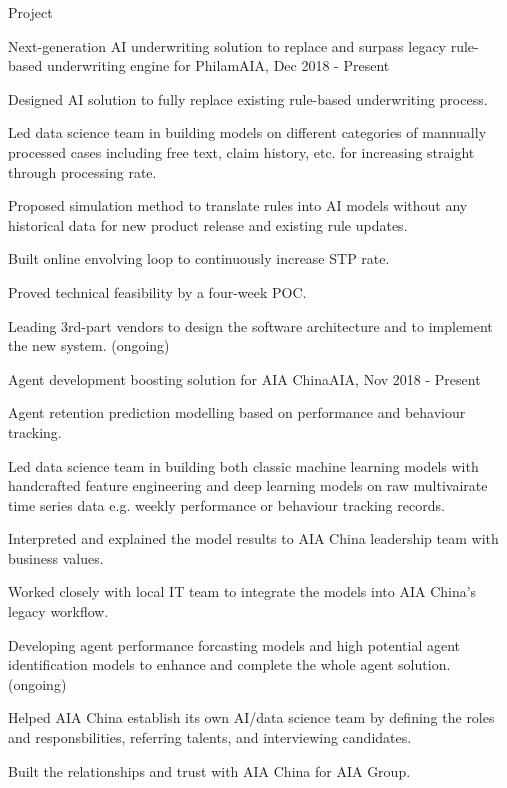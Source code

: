 \documentclass{resume} %
\begin{document}
\begin{rSection}{Project}

\begin{rSubsection}{Next-generation AI underwriting solution to replace and surpass legacy rule-based underwriting engine for Philam}{}{AIA, Dec 2018 - Present}{}
\item Designed AI solution to fully replace existing rule-based underwriting process.
\item Led data science team in building models on different categories of mannually processed cases including free text, claim history, etc. for increasing straight through processing rate.
\item Proposed simulation method to translate rules into AI models without any historical data for new product release and existing rule updates.
\item Built online envolving loop to continuously increase STP rate.
\item Proved technical feasibility by a four-week POC.
\item Leading 3rd-part vendors to design the software architecture and to implement the new system. (ongoing)
\end{rSubsection}


\begin{rSubsection}{Agent development boosting solution for AIA China}{}{AIA, Nov 2018 - Present}{}
\item Agent retention prediction modelling based on performance and behaviour tracking.
\item Led data science team in building both classic machine learning models with handcrafted feature engineering and deep learning models on raw multivairate time series data e.g. weekly performance or behaviour tracking records.
\item Interpreted and explained the model results to AIA China leadership team with business values.
\item Worked closely with local IT team to integrate the models into AIA China's legacy workflow.
\item Developing agent performance forcasting models and high potential agent identification models to enhance and complete the whole agent solution. (ongoing)
\item Helped AIA China establish its own AI/data science team by defining the roles and responsbilities, referring talents, and interviewing candidates.
\item Built the relationships and trust with AIA China for AIA Group.
\end{rSubsection}


\end{rSection}
\end{document}
